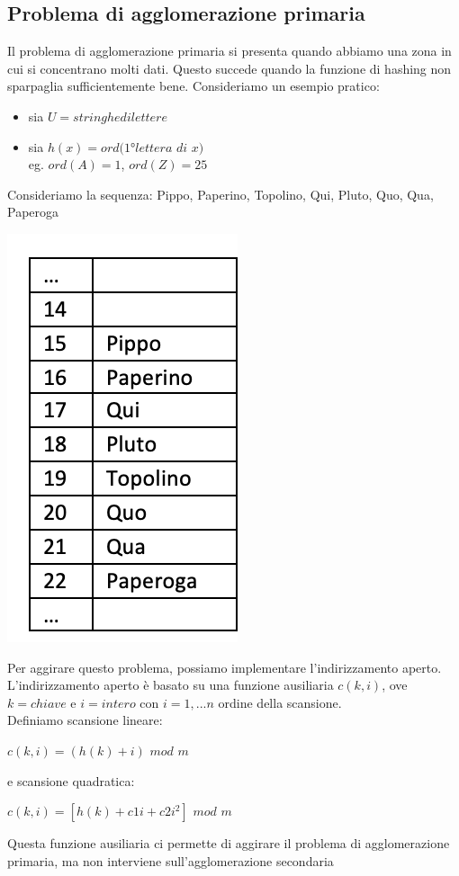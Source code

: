 \documentclass[11pt, oneside]{article}   	%
\begin{document}
\subsection*{Problema di agglomerazione primaria}
Il problema di agglomerazione primaria si presenta quando abbiamo una zona in cui si concentrano molti dati. Questo succede quando la funzione di hashing non sparpaglia sufficientemente bene. Consideriamo un esempio pratico:
\begin{itemize}
\item sia $U = stringhe di lettere$
\item sia $h(x) = ord(1°lettera$ $di$ $x)$\\
eg. $ord(A) =1$, $ord(Z) = 25$
\end{itemize}
Consideriamo la sequenza: Pippo, Paperino, Topolino, Qui, Pluto, Quo, Qua, Paperoga
\begin{center}
\includegraphics[scale=0.6]{h3}
\end{center}
Per aggirare questo problema, possiamo implementare l'indirizzamento aperto. L'indirizzamento aperto è basato su una funzione ausiliaria $c(k,i)$, ove $k = chiave$ e $i = intero$ con $i = 1,...n$ ordine della scansione.\\
Definiamo scansione lineare: \begin{center} $c(k,i) = (h(k)+i)$ $mod$ $m$\end{center}
e scansione quadratica:  \begin{center} $c(k,i) = [h(k)+c1i+ c2i^2]$ $mod$ $m$\end{center}
Questa funzione ausiliaria ci permette di aggirare il problema di agglomerazione primaria, ma non interviene sull'agglomerazione secondaria
\end{document}
